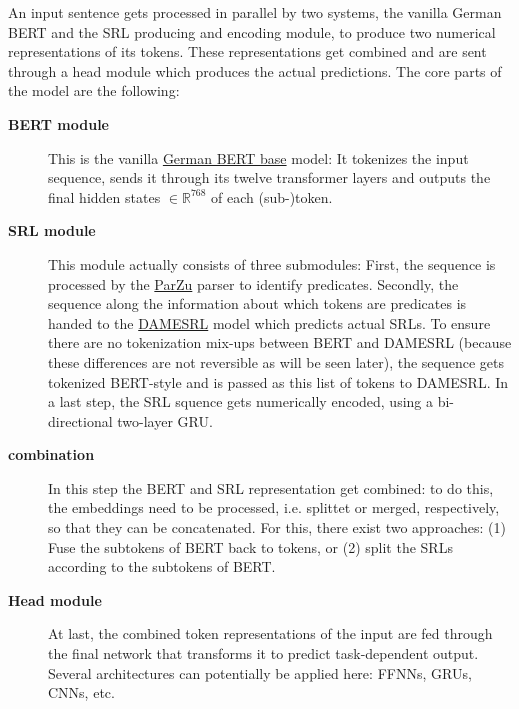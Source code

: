 
An input sentence gets processed in parallel by two systems, the vanilla German BERT
and the SRL producing and encoding module, to produce two numerical representations
of its tokens. These representations get combined and are sent through a head module
which produces the actual predictions. The core parts of the model are the following:

\begin{description}
	\item[\textbf{BERT module}] This is the vanilla \href{https://deepset.ai/german-bert}{German BERT base} model: It tokenizes the input sequence, sends it through its twelve transformer layers and outputs the final hidden states $\in \mathbb{R}^{768}$ of each (sub-)token.
  \item[\textbf{SRL module}] This module actually consists of three submodules: First, the sequence is processed by the \href{https://github.com/rsennrich/ParZu}{ParZu} \citep{sennrich2009new} parser to identify predicates.
	Secondly, the sequence along the information about which tokens are predicates is handed to the \href{https://liir.cs.kuleuven.be/software_pages/damesrl.php}{DAMESRL} model \citep{do2018flexible} which predicts actual SRLs.
	To ensure there are no tokenization mix-ups between BERT and DAMESRL (because these differences are not reversible as will be seen later), the sequence gets tokenized BERT-style and is passed as this list of tokens to DAMESRL. In a last step,
	the SRL squence gets numerically encoded, using a bi-directional two-layer GRU.
  \item[\textbf{combination}] In this step the BERT and SRL representation get combined: to do this, the embeddings need to be processed, i.e. splittet or merged, respectively, so that they can be concatenated.
	For this, there exist two approaches:
	(1) Fuse the subtokens of BERT back to tokens, or (2) split the SRLs according to the subtokens of BERT.
  \item[\textbf{Head module}] At last, the combined token representations of the input are fed through the final network that transforms it to predict task-dependent output. Several architectures can potentially be applied here: FFNNs, GRUs, CNNs, etc.
\end{description}

